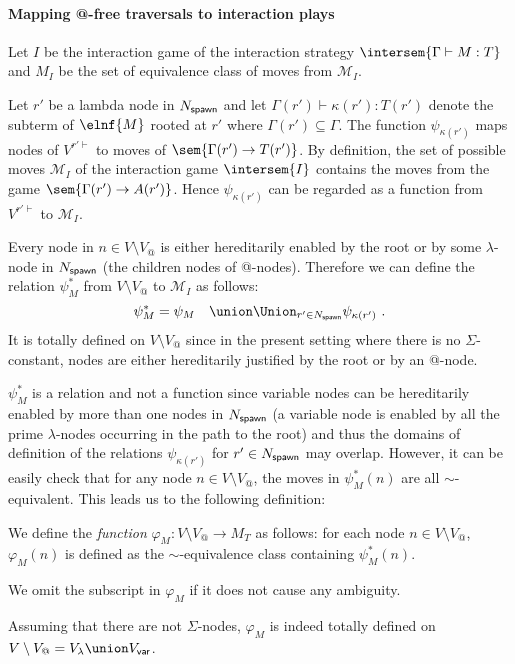 \paragraph{Mapping @-free traversals to interaction plays}
    Let $I$ be the interaction game of the interaction strategy $\intersem{\Gamma \vdash M : T}$ and
    $M_I$ be the set of equivalence class of moves from $\mathcal{M}_I$.

    Let $r'$ be a lambda node in $N_{\sf spawn}$ and let $\Gamma(r') \vdash \kappa(r') : T(r')$ denote the subterm of $\elnf{M}$ rooted at $r'$ where $\Gamma(r')\subseteq \Gamma$.
    The function $\psi_{\kappa(r')}$ maps nodes of $V^{r'\vdash}$
    to moves of $\sem{\Gamma(r') \rightarrow T(r')}$. By definition,
    the set of possible moves $\mathcal{M}_I$ of the interaction game $\intersem{I}$ contains the
    moves from the game $\sem{\Gamma(r') \rightarrow A(r')}$. Hence $\psi_{\kappa(r')}$ can be regarded as a function from $V^{r'\vdash}$ to $\mathcal{M}_I$.

    Every node in $n \in V\setminus V_@$ is either hereditarily enabled by the root or by some $\lambda$-node in $N_{\sf spawn}$ (the children nodes of @-nodes). Therefore we can define the relation $\psi^*_M$ from
    $V\setminus V_@$ to $\mathcal{M}_I$ as follows:
    $$ \psi^*_M = \psi_{M} \quad \union \Union_{r' \in N_{\sf spawn}} \psi_{\kappa(r')} \ .$$
    It is totally defined on $V\setminus V_@$ since in the present setting where there is no $\Sigma$-constant, nodes are either hereditarily justified by the root or by an @-node.

    $\psi^*_M$ is a relation and not a function since variable nodes can be hereditarily enabled by more than one nodes in $N_{\sf spawn}$  (a variable node is enabled by all the prime $\lambda$-nodes occurring in the path to the root) and thus the domains of definition of the relations $\psi_{\kappa(r')}$ for $r' \in N_{\sf spawn}$ may overlap.  However, it can be easily check that for any node $n \in V\setminus V_@$,
    the moves in $\psi^*_M (n)$ are all $\sim$-equivalent. This leads us to the following definition:
    
    \begin{definition}
        \label{def:phi mapping}
        We define the \emph{function}
        $\varphi_M:V\setminus V_@ \rightarrow M_T$ as follows: for each node $n \in V\setminus V_@$,
        $\varphi_M(n)$ is defined as the $\sim$-equivalence class containing $\psi^*_M (n)$.

        We omit the subscript in $\varphi_M$ if it does not cause any ambiguity.
    \end{definition}
    Assuming that there are not $\Sigma$-nodes, $\varphi_M$ is indeed totally defined on $V \setminus V_@ = V_\lambda \union V_{\sf var}$.

